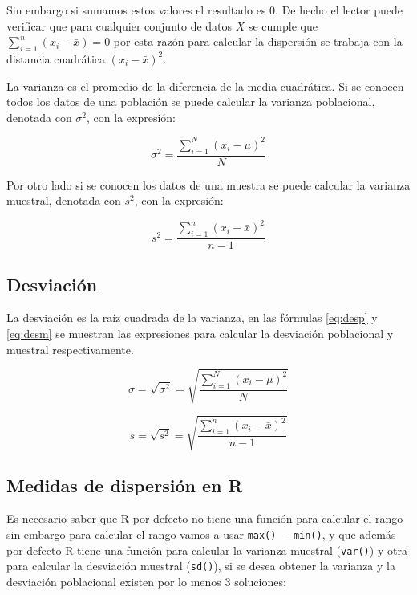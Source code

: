 \documentclass[letterpaper,]{book}
\begin{document}
Sin embargo si sumamos estos valores el resultado es \(0\). De hecho el lector puede verificar que para cualquier conjunto de datos \(X\) se cumple que \(\sum_{i=1}^n{\left(x_i-\bar{x}\right)}=0\) por esta razón para calcular la dispersión se trabaja con la distancia cuadrática \(\left(x_i-\bar{x}\right)^2\).

La varianza es el promedio de la diferencia de la media cuadrática. Si se conocen todos los datos de una población se puede calcular la varianza poblacional, denotada con \(\sigma^2\), con la expresión:

\begin{equation} 
  \sigma^2 = \dfrac{\sum_{i=1}^{N}\left(x_i- \mu \right)^2}{N}
  \label{eq:varp}
\end{equation}

Por otro lado si se conocen los datos de una muestra se puede calcular la varianza muestral, denotada con \(s^2\), con la expresión:

\begin{equation} 
  s^2 = \dfrac{\sum_{i=1}^{n}\left(x_i - \bar{x} \right)^2}{n-1}
  \label{eq:varm}
\end{equation}

\hypertarget{desviacion}{%
\subsection{Desviación}\label{desviacion}}

La desviación es la raíz cuadrada de la varianza, en las fórmulas \eqref{eq:desp} y \eqref{eq:desm} se muestran las expresiones para calcular la desviación poblacional y muestral respectivamente.

\begin{equation} 
  \sigma = \sqrt{\sigma^2} = \sqrt{\dfrac{\sum_{i=1}^{N}\left(x_i- \mu \right)^2}{N}}
  \label{eq:desp}
\end{equation}

\begin{equation} 
  s = \sqrt{s^2} = \sqrt{\dfrac{\sum_{i=1}^{n}\left(x_i- \bar{x} \right)^2}{n-1}}
  \label{eq:desm}
\end{equation}

\hypertarget{medidas-de-dispersion-en-r}{%
\subsection{Medidas de dispersión en R}\label{medidas-de-dispersion-en-r}}

Es necesario saber que R por defecto no tiene una función para calcular el rango sin embargo para calcular el rango vamos a usar \texttt{max()\ -\ min()}, y que además por defecto R tiene una función para calcular la varianza muestral (\texttt{var()}) y otra para calcular la desviación muestral (\texttt{sd()}), si se desea obtener la varianza y la desviación poblacional existen por lo menos 3 soluciones:
\end{document}
